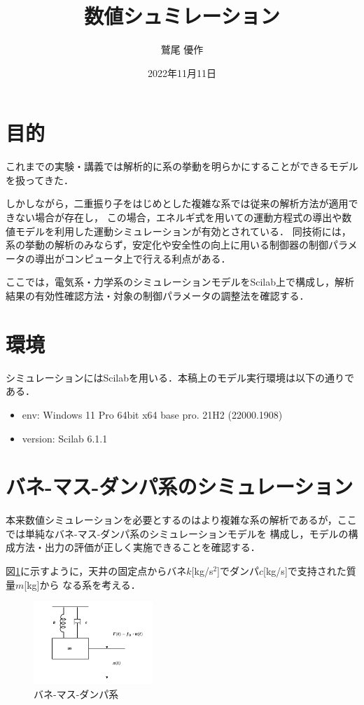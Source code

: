 \documentclass[dvipdfmx,titlepage,a4j]{jsarticle}  %
\title{数値シュミレーション}
\author{鷲尾 優作}
\date{2022年11月11日}
\begin{document}
\pagestyle{foot}

\maketitle

\section{目的}
これまでの実験・講義では解析的に系の挙動を明らかにすることができるモデルを扱ってきた．

しかしながら，二重振り子をはじめとした複雑な系では従来の解析方法が適用できない場合が存在し，
この場合，エネルギ式を用いての運動方程式の導出や数値モデルを利用した運動シミュレーションが有効とされている．
同技術には，系の挙動の解析のみならず，安定化や安全性の向上に用いる制御器の制御パラメータの導出がコンピュータ上で行える利点がある．

ここでは，電気系・力学系のシミュレーションモデルをScilab上で構成し，解析結果の有効性確認方法・対象の制御パラメータの調整法を確認する．

\section{環境}
シミュレーションにはScilabを用いる．本稿上のモデル実行環境は以下の通りである．

\begin{itemize}
  \item env: Windows 11 Pro 64bit x64 base pro. 21H2 (22000.1908)
  \item version: Scilab 6.1.1
\end{itemize}

\section{バネ-マス-ダンパ系のシミュレーション}
本来数値シミュレーションを必要とするのはより複雑な系の解析であるが，ここでは単純なバネ-マス-ダンパ系のシミュレーションモデルを
構成し，モデルの構成方法・出力の評価が正しく実施できることを確認する．

図\ref{fig:spring-mass-damper}に示すように，天井の固定点からバネ$k$[kg/s$^2$]でダンパ$c$[kg/s]で支持された質量$m$[kg]から
なる系を考える．

\begin{figure}[H]
  \centering
  \includegraphics[width=0.4\textwidth]{../graph/bane-po.png}
  \caption{バネ-マス-ダンパ系}
  \label{fig:spring-mass-damper}
\end{figure}
\end{document}
